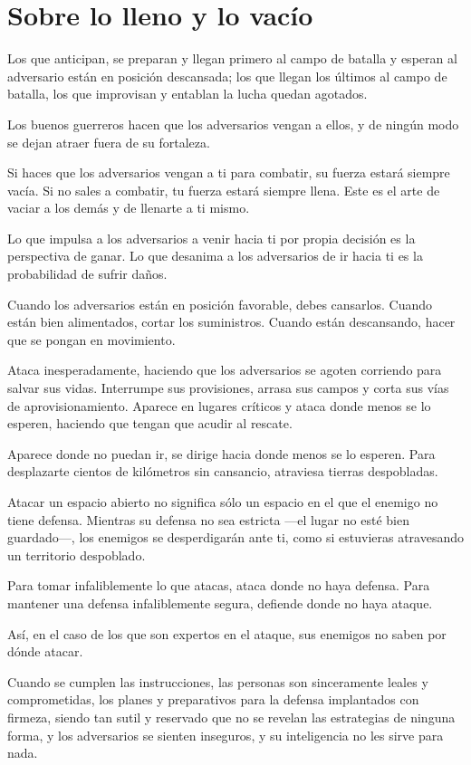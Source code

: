 \chapter{Sobre lo lleno y lo vacío}

Los que anticipan, se preparan y llegan primero al campo de batalla y esperan al adversario están en posición descansada; los que llegan los últimos al campo de batalla, los que improvisan y entablan la lucha quedan agotados.

Los buenos guerreros hacen que los adversarios vengan a ellos, y de ningún modo se dejan atraer fuera de su fortaleza.

Si haces que los adversarios vengan a ti para combatir, su fuerza estará siempre vacía. Si no sales a combatir, tu fuerza estará siempre llena. Este es el arte de vaciar a los demás y de llenarte a ti mismo.

Lo que impulsa a los adversarios a venir hacia ti por propia decisión es la perspectiva de ganar. Lo que desanima a los adversarios de ir hacia ti es la probabilidad de sufrir daños.

Cuando los adversarios están en posición favorable, debes cansarlos. Cuando están bien alimentados, cortar los suministros. Cuando están descansando, hacer que se pongan en movimiento.

Ataca inesperadamente, haciendo que los adversarios se agoten corriendo para salvar sus vidas. Interrumpe sus provisiones, arrasa sus campos y corta sus vías de aprovisionamiento. Aparece en lugares críticos y ataca donde menos se lo esperen, haciendo que tengan que acudir al rescate.

Aparece donde no puedan ir, se dirige hacia donde menos se lo esperen. Para desplazarte cientos de kilómetros sin cansancio, atraviesa tierras despobladas.

Atacar un espacio abierto no significa sólo un espacio en el que el enemigo no tiene defensa. Mientras su defensa no sea estricta ---el lugar no esté bien guardado---, los enemigos se desperdigarán ante ti, como si estuvieras atravesando un territorio despoblado.

Para tomar infaliblemente lo que atacas, ataca donde no haya defensa. Para mantener una defensa infaliblemente segura, defiende donde no haya ataque.

Así, en el caso de los que son expertos en el ataque, sus enemigos no saben por dónde atacar.

Cuando se cumplen las instrucciones, las personas son sinceramente leales y comprometidas, los planes y preparativos para la defensa implantados con firmeza, siendo tan sutil y reservado que no se revelan las estrategias de ninguna forma, y los adversarios se sienten inseguros, y su inteligencia no les sirve para nada.


